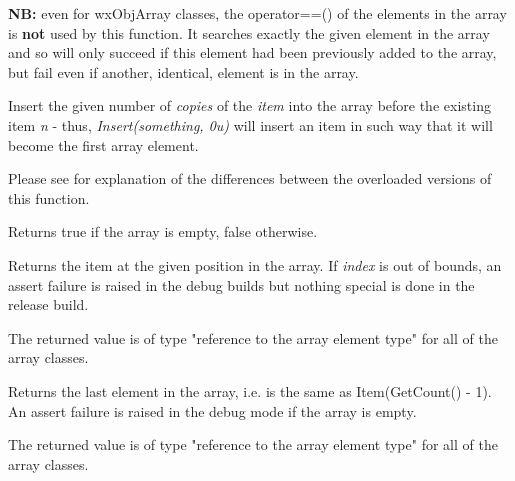 {\bf NB:} even for wxObjArray classes, the operator==() of the elements in the
array is {\bf not} used by this function. It searches exactly the given
element in the array and so will only succeed if this element had been
previously added to the array, but fail even if another, identical, element is
in the array.

\label{wxarrayinsert}




Insert the given number of {\it copies} of the {\it item} into the array before
the existing item {\it n} - thus, {\it Insert(something, 0u)} will insert an
item in such way that it will become the first array element.

Please see  for explanation of the differences
between the overloaded versions of this function.

\label{wxarrayisempty}


Returns true if the array is empty, false otherwise.

\label{wxarrayitem}


Returns the item at the given position in the array. If {\it index} is out of
bounds, an assert failure is raised in the debug builds but nothing special is
done in the release build.

The returned value is of type "reference to the array element type" for all of
the array classes.

\label{wxarraylast}


Returns the last element in the array, i.e. is the same as Item(GetCount() - 1).
An assert failure is raised in the debug mode if the array is empty.

The returned value is of type "reference to the array element type" for all of
the array classes.

\label{wxarrayremove}

